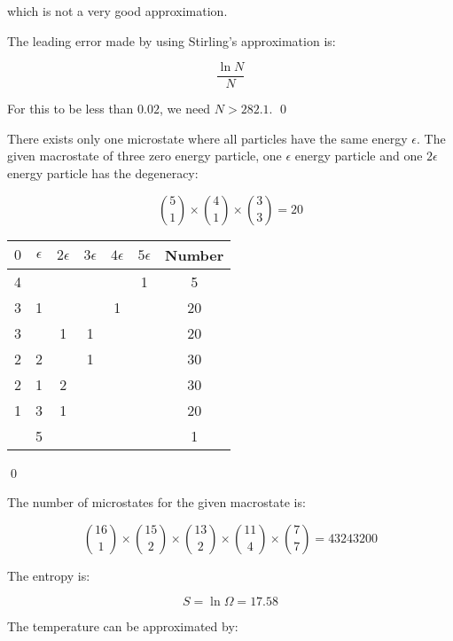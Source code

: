 \documentclass[12pt]{article}
\begin{document}
which is not a very good approximation.

The leading error made by using Stirling's approximation is:

\begin{equation}
    \frac{\ln{N}}{N}
\end{equation}

For this to be less than $0.02$, we need $N > 282.1$.
\qed


There exists only one microstate where all particles have the same energy $\epsilon$. The given macrostate of three zero energy particle, one $\epsilon$ energy particle and one $2\epsilon$ energy particle has the degeneracy:

\begin{equation}
    \binom{5}{1} \times \binom{4}{1} \times \binom{3}{3} = 20
\end{equation}

\begin{table}[h]
\centering
\begin{tabular}{|c|c|c|c|c|c|c|}
\hline
$0$ & $\epsilon$ & $2\epsilon$ & $3\epsilon$ & $4\epsilon$ & $5\epsilon$ & Number \\ \hline
4 &   &   &   &   & 1 & 5      \\ \hline
3 & 1 &   &   & 1 &   & 20     \\ \hline
3 &   & 1 & 1 &   &   & 20     \\ \hline
2 & 2 &   & 1 &   &   & 30     \\ \hline
2 & 1 & 2 &   &   &   & 30     \\ \hline
1 & 3 & 1 &   &   &   & 20     \\ \hline
  & 5 &   &   &   &   & 1      \\ \hline
\end{tabular}
\end{table}
\qed


The number of microstates for the given macrostate is:

\begin{equation}
    \binom{16}{1} \times \binom{15}{2} \times \binom{13}{2} \times \binom{11}{4} \times \binom{7}{7} = 43243200
\end{equation}

The entropy is:

\begin{equation}
    S = \ln{\Omega} = 17.58
\end{equation}

The temperature can be approximated by:
\end{document}
